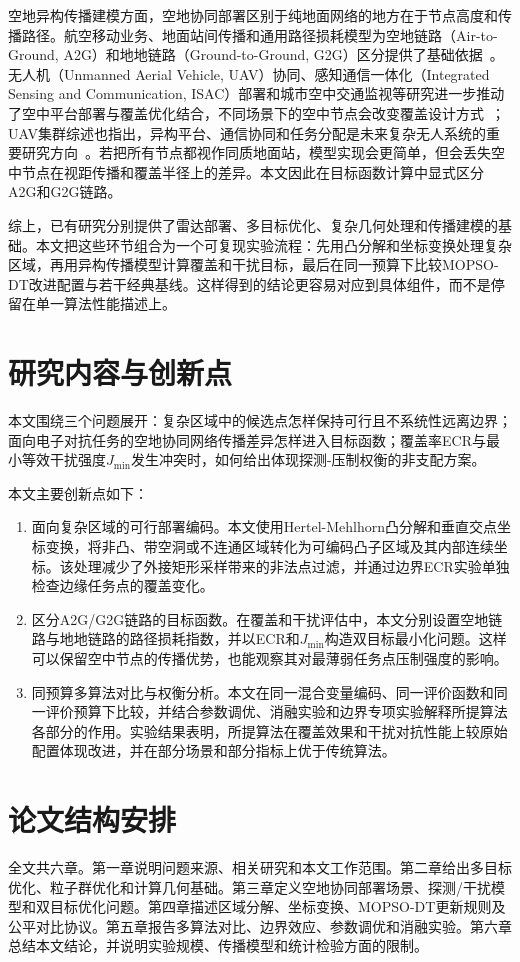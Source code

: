 空地异构传播建模方面，空地协同部署区别于纯地面网络的地方在于节点高度和传播路径。航空移动业务、地面站间传播和通用路径损耗模型为空地链路（Air-to-Ground, A2G）和地地链路（Ground-to-Ground, G2G）区分提供了基础依据~\cite{ITUP528,ITUP452,Rappaport2002}。无人机（Unmanned Aerial Vehicle, UAV）协同、感知通信一体化（Integrated Sensing and Communication, ISAC）部署和城市空中交通监视等研究进一步推动了空中平台部署与覆盖优化结合，不同场景下的空中节点会改变覆盖设计方式~\cite{Li2025,Milone2024}；UAV集群综述也指出，异构平台、通信协同和任务分配是未来复杂无人系统的重要研究方向~\cite{Alqudsi2025UAVSwarms}。若把所有节点都视作同质地面站，模型实现会更简单，但会丢失空中节点在视距传播和覆盖半径上的差异。本文因此在目标函数计算中显式区分A2G和G2G链路。

综上，已有研究分别提供了雷达部署、多目标优化、复杂几何处理和传播建模的基础。本文把这些环节组合为一个可复现实验流程：先用凸分解和坐标变换处理复杂区域，再用异构传播模型计算覆盖和干扰目标，最后在同一预算下比较MOPSO-DT改进配置与若干经典基线。这样得到的结论更容易对应到具体组件，而不是停留在单一算法性能描述上。

\section{研究内容与创新点}

本文围绕三个问题展开：复杂区域中的候选点怎样保持可行且不系统性远离边界；面向电子对抗任务的空地协同网络传播差异怎样进入目标函数；覆盖率ECR与最小等效干扰强度$J_{\min}$发生冲突时，如何给出体现探测-压制权衡的非支配方案。

本文主要创新点如下：

\begin{enumerate}
    \item 面向复杂区域的可行部署编码。本文使用Hertel-Mehlhorn凸分解和垂直交点坐标变换，将非凸、带空洞或不连通区域转化为可编码凸子区域及其内部连续坐标。该处理减少了外接矩形采样带来的非法点过滤，并通过边界ECR实验单独检查边缘任务点的覆盖变化。
    \item 区分A2G/G2G链路的目标函数。在覆盖和干扰评估中，本文分别设置空地链路与地地链路的路径损耗指数，并以ECR和$J_{\min}$构造双目标最小化问题。这样可以保留空中节点的传播优势，也能观察其对最薄弱任务点压制强度的影响。
    \item 同预算多算法对比与权衡分析。本文在同一混合变量编码、同一评价函数和同一评价预算下比较，并结合参数调优、消融实验和边界专项实验解释所提算法各部分的作用。实验结果表明，所提算法在覆盖效果和干扰对抗性能上较原始配置体现改进，并在部分场景和部分指标上优于传统算法。
\end{enumerate}

\section{论文结构安排}

全文共六章。第一章说明问题来源、相关研究和本文工作范围。第二章给出多目标优化、粒子群优化和计算几何基础。第三章定义空地协同部署场景、探测/干扰模型和双目标优化问题。第四章描述区域分解、坐标变换、MOPSO-DT更新规则及公平对比协议。第五章报告多算法对比、边界效应、参数调优和消融实验。第六章总结本文结论，并说明实验规模、传播模型和统计检验方面的限制。
